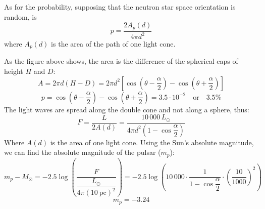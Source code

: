 As for the probability, supposing that the neutron star space orientation is
random, is
\[
p = \frac{2A_p(d)}{4\pi d^2} \tag*{(2 pt)}
\]
where $A_p(d)$ is the area of the path of one light cone.


As the figure above shows, the area is the difference of the spherical caps of
height $H$ and $D$:
\[
A = 2\pi d (H - D)
  = 2\pi d^2 \left[\cos\left(\theta - \frac{\alpha}{2}\right)
    - \cos\left(\theta + \frac{\alpha}{2}\right)\right] \tag*{(3 pt)}
\]
\[
p = \cos\left(\theta - \frac{\alpha}{2}\right)
  - \cos\left(\theta + \frac{\alpha}{2}\right)
  = 3.5 \cdot 10^{-2} \quad \text{or} \quad 3.5\% \tag*{(2 pt)}
\]
The light waves are spread along the double cone and not along a sphere, thus:
\[
F = \frac{L}{2A(d)}
  = \frac{10\,000\,L_\odot}{4\pi d^2\left(1 - \cos\dfrac{\alpha}{2}\right)}
\]
Where $A(d)$ is the area of one light cone. Using the Sun's absolute magnitude,
we can find the absolute magnitude of the pulsar ($m_p$):
\[
m_p - M_\odot
  = -2.5\log\left(\frac{F}{\dfrac{L_\odot}{4\pi(10~\mathrm{pc})^2}}\right)
  = -2.5\log\left(10\,000 \cdot \frac{1}{1 - \cos\dfrac{\alpha}{2}}
    \cdot \left(\frac{10}{1000}\right)^2\right) \tag*{(3 pt)}
\]
\[
m_p = -3.24
\]
